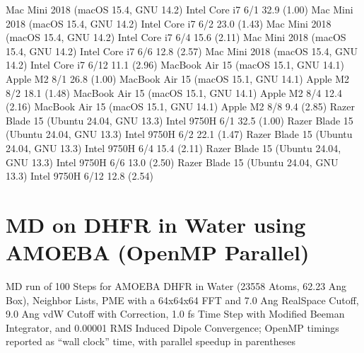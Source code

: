 \documentclass[letterpaper,11pt,english]{sphinxmanual}
\begin{document}
\sphinxAtStartPar
{}

\begin{sphinxVerbatim}[commandchars=\\\{\}]
Mac Mini 2018 (macOS 15.4, GNU 14.2)      Intel Core i7       6/1        32.9 (1.00)
Mac Mini 2018 (macOS 15.4, GNU 14.2)      Intel Core i7       6/2        23.0 (1.43)
Mac Mini 2018 (macOS 15.4, GNU 14.2)      Intel Core i7       6/4        15.6 (2.11)
Mac Mini 2018 (macOS 15.4, GNU 14.2)      Intel Core i7       6/6        12.8 (2.57)
Mac Mini 2018 (macOS 15.4, GNU 14.2)      Intel Core i7      6/12        11.1 (2.96)
MacBook Air 15 (macOS 15.1, GNU 14.1)        Apple M2         8/1        26.8 (1.00)
MacBook Air 15 (macOS 15.1, GNU 14.1)        Apple M2         8/2        18.1 (1.48)
MacBook Air 15 (macOS 15.1, GNU 14.1)        Apple M2         8/4        12.4 (2.16)
MacBook Air 15 (macOS 15.1, GNU 14.1)        Apple M2         8/8         9.4 (2.85)
Razer Blade 15 (Ubuntu 24.04, GNU 13.3)    Intel 9750H        6/1        32.5 (1.00)
Razer Blade 15 (Ubuntu 24.04, GNU 13.3)    Intel 9750H        6/2        22.1 (1.47)
Razer Blade 15 (Ubuntu 24.04, GNU 13.3)    Intel 9750H        6/4        15.4 (2.11)
Razer Blade 15 (Ubuntu 24.04, GNU 13.3)    Intel 9750H        6/6        13.0 (2.50)
Razer Blade 15 (Ubuntu 24.04, GNU 13.3)    Intel 9750H       6/12        12.8 (2.54)
\end{sphinxVerbatim}


\section{MD on DHFR in Water using AMOEBA (OpenMP Parallel)}
\label{\detokenize{text/benchmarks:md-on-dhfr-in-water-using-amoeba-openmp-parallel}}
\sphinxAtStartPar
MD run of 100 Steps for AMOEBA DHFR in Water (23558 Atoms, 62.23 Ang Box), Neighbor Lists, PME with a 64x64x64 FFT and 7.0 Ang Real\sphinxhyphen{}Space Cutoff, 9.0 Ang vdW Cutoff with Correction, 1.0 fs Time Step with Modified Beeman Integrator, and 0.00001 RMS Induced Dipole Convergence; OpenMP timings reported as “wall clock” time, with parallel speedup in parentheses

\sphinxAtStartPar
{}
\end{document}
